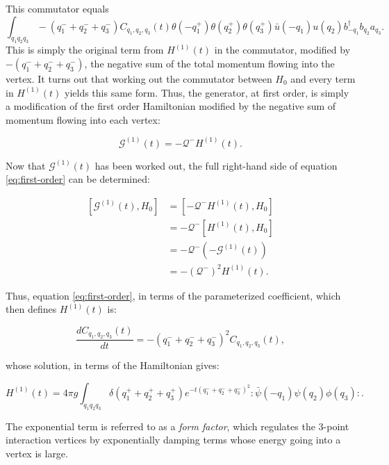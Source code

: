 This commutator equals $$\int_{q_1 q_2 q_3}-\left(q_1^- + q_2^- + q_3^- \right)C_{q_1, q_2, q_3}(t)\theta(-q_1^+)\theta(q_2^+)\theta(q_3^+) \bar u(-q_1) u(q_2) b_{-q_1}^\dagger b_{q_2} a_{q_3}.$$
This is simply the original term from $H^{(1)}(t)$ in the commutator, modified by $-\left(q_1^- + q_2^- + q_3^- \right)$, the negative sum of the total momentum flowing into the vertex. 
It turns out that working out the commutator between $H_0$ and every term in $H^{(1)}(t)$ yields this same form.
Thus, the generator, at first order, is simply a modification of the first order Hamiltonian modified by the negative sum of momentum flowing into each vertex:

\begin{equation}
    \mathcal{G}^{(1)}(t) = -\mathcal{Q}^- H^{(1)}(t).
\end{equation}

Now that $\mathcal{G}^{(1)}(t)$ has been worked out, the full right-hand side of equation \ref{eq:first-order} can be determined:

\begin{align*}
    \left[\mathcal{G}^{(1)}(t), H_0 \right] &= \left[-\mathcal{Q}^- H^{(1)}(t), H_0 \right]\\
    &= -\mathcal{Q}^-\left[H^{(1)}(t), H_0 \right]\\
    &= -\mathcal{Q}^- \left(-\mathcal{G}^{(1)}(t) \right)\\
    &= -\left(\mathcal{Q}^-\right)^2H^{(1)}(t).
\end{align*}

Thus, equation \ref{eq:first-order}, in terms of the parameterized coefficient, which then defines $H^{(1)}(t)$ is:

\begin{equation*}
    \frac{dC_{q_1, q_2, q_3}(t)}{dt} = -(q_1^- + q_2^- + q_3^-)^2C_{q_1, q_2, q_3}(t),
\end{equation*}

whose solution, in terms of the Hamiltonian gives:

\begin{equation}
    H^{(1)}(t) = 4\pi g\int_{q_1 q_2 q_3}\delta(q_1^+ + q_2^+ +q_3^+)e^{-t\left(q_1^- + q_2^- + q_3^-\right)^2}:\bar \psi(-q_1) \psi(q_2) \phi(q_3):.
\end{equation}

The exponential term is referred to as a \textit{form factor}, which regulates the 3-point interaction vertices by exponentially damping terms whose energy going into a vertex is large.

